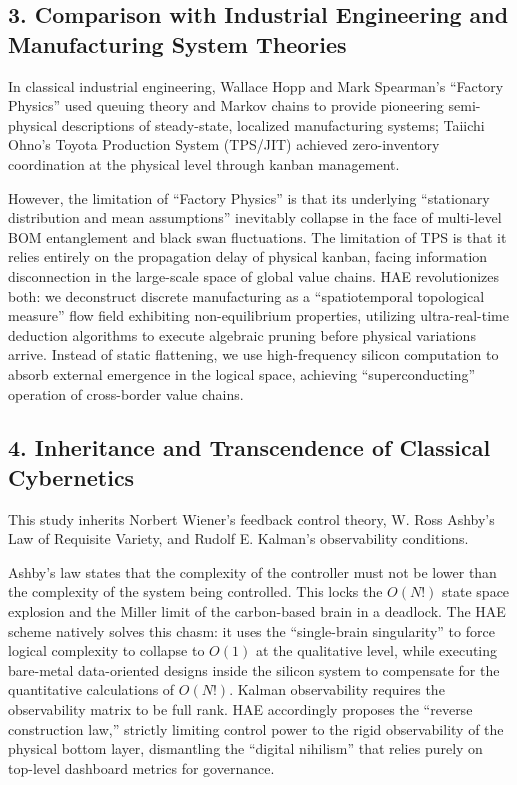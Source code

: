 \documentclass{article}
\begin{document}
\subsection*{3. Comparison with Industrial Engineering and Manufacturing System Theories}
In classical industrial engineering, Wallace Hopp and Mark Spearman's ``Factory Physics'' used queuing theory and Markov chains to provide pioneering semi-physical descriptions of steady-state, localized manufacturing systems; Taiichi Ohno's Toyota Production System (TPS/JIT) achieved zero-inventory coordination at the physical level through kanban management.

However, the limitation of ``Factory Physics'' is that its underlying ``stationary distribution and mean assumptions'' inevitably collapse in the face of multi-level BOM entanglement and black swan fluctuations. The limitation of TPS is that it relies entirely on the propagation delay of physical kanban, facing information disconnection in the large-scale space of global value chains. HAE revolutionizes both: we deconstruct discrete manufacturing as a ``spatiotemporal topological measure'' flow field exhibiting non-equilibrium properties, utilizing ultra-real-time deduction algorithms to execute algebraic pruning before physical variations arrive. Instead of static flattening, we use high-frequency silicon computation to absorb external emergence in the logical space, achieving ``superconducting'' operation of cross-border value chains.

\subsection*{4. Inheritance and Transcendence of Classical Cybernetics}
This study inherits Norbert Wiener's feedback control theory, W. Ross Ashby's Law of Requisite Variety, and Rudolf E. Kalman's observability conditions.

Ashby's law states that the complexity of the controller must not be lower than the complexity of the system being controlled. This locks the $O(N!)$ state space explosion and the Miller limit of the carbon-based brain in a deadlock. The HAE scheme natively solves this chasm: it uses the ``single-brain singularity'' to force logical complexity to collapse to $O(1)$ at the qualitative level, while executing bare-metal data-oriented designs inside the silicon system to compensate for the quantitative calculations of $O(N!)$. Kalman observability requires the observability matrix to be full rank. HAE accordingly proposes the ``reverse construction law,'' strictly limiting control power to the rigid observability of the physical bottom layer, dismantling the ``digital nihilism'' that relies purely on top-level dashboard metrics for governance.
\end{document}
